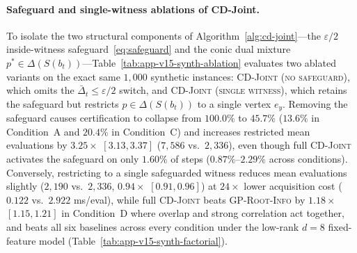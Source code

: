 \documentclass{article}
\theoremstyle{plain}
\theoremstyle{definition}
\begin{document}
\paragraph{Safeguard and single-witness ablations of CD-Joint.}
To isolate the two structural components of Algorithm~\ref{alg:cd-joint}---the $\varepsilon/2$ inside-witness safeguard~\eqref{eq:safeguard} and the conic dual mixture $p^*\in\Delta(S(b_t))$---Table~\ref{tab:app-v15-synth-ablation} evaluates two ablated variants on the exact same $1{,}000$ synthetic instances: \textsc{CD-Joint (no safeguard)}, which omits the $\bar\Delta_t\le\varepsilon/2$ switch, and \textsc{CD-Joint (single witness)}, which retains the safeguard but restricts $p\in\Delta(S(b_t))$ to a single vertex $e_y$. Removing the safeguard causes certification to collapse from $100.0\%$ to $45.7\%$ ($13.6\%$ in Condition~A and $20.4\%$ in Condition~C) and increases restricted mean evaluations by $3.25\times$ $[3.13,3.37]$ ($7{,}586$ vs.\ $2{,}336$), even though full \textsc{CD-Joint} activates the safeguard on only $1.60\%$ of steps ($0.87\%$--$2.29\%$ across conditions). Conversely, restricting to a single safeguarded witness reduces mean evaluations slightly ($2{,}190$ vs.\ $2{,}336$, $0.94\times$ $[0.91,0.96]$) at $24\times$ lower acquisition cost ($0.122$ vs.\ $2.922$ ms/eval), while full \textsc{CD-Joint} beats \textsc{GP-Root-Info} by $1.18\times$ $[1.15,1.21]$ in Condition~D where overlap and strong correlation act together, and beats all six baselines across every condition under the low-rank $d=8$ fixed-feature model (Table~\ref{tab:app-v15-synth-factorial}).
\end{document}
